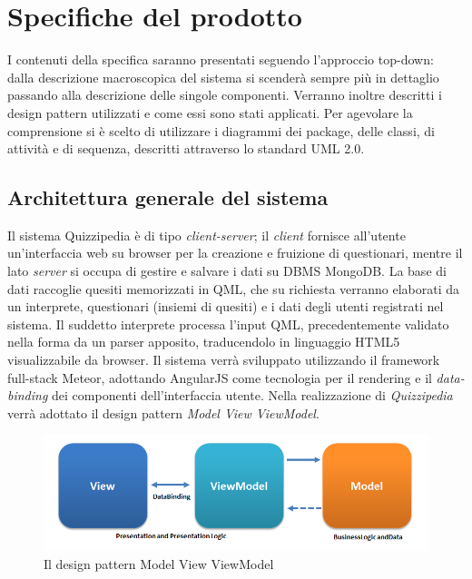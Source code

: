 \section{Specifiche del prodotto}
	I contenuti della specifica saranno presentati seguendo l'approccio top-down: dalla descrizione macroscopica del sistema si scenderà sempre più in dettaglio passando alla descrizione delle singole componenti. Verranno inoltre descritti i design pattern utilizzati e come essi sono stati applicati. Per agevolare la comprensione si è scelto di utilizzare i diagrammi dei package, delle classi, di attività e di sequenza, descritti attraverso lo standard UML 2.0.
	
	\subsection{Architettura generale del sistema}
	Il sistema Quizzipedia è di tipo \emph{client-server}; il \emph{client} fornisce all'utente un'interfaccia web su browser per la creazione e fruizione di questionari, mentre il lato \emph{server} si occupa di gestire e salvare i dati su DBMS MongoDB. La base di dati raccoglie quesiti memorizzati in QML, che su richiesta verranno elaborati da un interprete, questionari (insiemi di quesiti) e i dati degli utenti registrati nel sistema.
Il suddetto interprete processa l'input QML, precedentemente validato nella forma da un parser apposito, traducendolo in linguaggio HTML5 visualizzabile da browser. Il sistema verrà sviluppato utilizzando il framework full-stack Meteor, adottando AngularJS come tecnologia per il rendering e il \emph{data-binding} dei componenti dell'interfaccia utente.
Nella realizzazione di \emph{Quizzipedia} verrà adottato il design pattern \emph{Model View ViewModel}.
\begin{figure}[h!]
\begin{center}
	\includegraphics[scale=0.8]{../images/mvvm.png}
	\caption{Il design pattern Model View ViewModel}
\end{center}
\end{figure}
